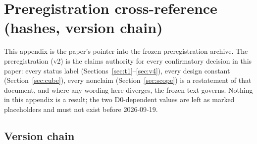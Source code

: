 \section{Preregistration cross-reference (hashes, version chain)}
\label{app:prereg}

\begingroup\sloppy

This appendix is the paper's pointer into the frozen preregistration
archive. The preregistration (v2) is the claims authority for every
confirmatory decision in this paper: every status label
(Sections~\ref{sec:t1}--\ref{sec:v4}), every design constant
(Section~\ref{sec:cube}), every nonclaim (Section~\ref{sec:scope}) is a
restatement of that document, and where any wording here diverges, the
frozen text governs. Nothing in this appendix is a result; the two
D0-dependent values are left as marked placeholders and must not exist
before 2026-09-19.

\subsection{Version chain}
\label{app:prereg-chain}

